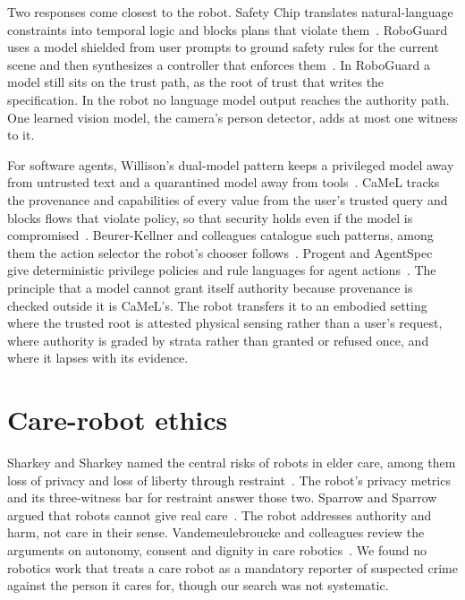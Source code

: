 Two responses come closest to the robot. Safety Chip translates natural-language constraints into
temporal logic and blocks plans that violate them~\cite{yang2024safetychip}. RoboGuard uses a
model shielded from user prompts to ground safety rules for the current scene and then synthesizes
a controller that enforces them~\cite{ravichandran2026roboguard}. In RoboGuard a model still sits
on the trust path, as the root of trust that writes the specification. In the robot no language
model output reaches the authority path. One learned vision model, the camera's person detector,
adds at most one witness to it.

For software agents, Willison's dual-model pattern keeps a privileged model away from untrusted
text and a quarantined model away from tools~\cite{willison2023dualllm}. CaMeL tracks the
provenance and capabilities of every value from the user's trusted query and blocks flows that
violate policy, so that security holds even if the model is compromised~\cite{debenedetti2026camel}.
Beurer-Kellner and colleagues catalogue such patterns, among them the action selector the robot's
chooser follows~\cite{beurerkellner2025patterns}. Progent and AgentSpec give deterministic
privilege policies and rule languages for agent actions~\cite{shi2025progent,wang2026agentspec}.
The principle that a model cannot grant itself authority because provenance is checked outside it
is CaMeL's. The robot transfers it to an embodied setting where the trusted root is attested
physical sensing rather than a user's request, where authority is graded by strata rather than
granted or refused once, and where it lapses with its evidence.

\section{Care-robot ethics}

Sharkey and Sharkey named the central risks of robots in elder care, among them loss of privacy and
loss of liberty through restraint~\cite{sharkey2012granny}. The robot's privacy metrics and its
three-witness bar for restraint answer those two. Sparrow and Sparrow argued that robots cannot
give real care~\cite{sparrow2006hands}. The robot addresses authority and harm, not care in their
sense. Vandemeulebroucke and colleagues review the arguments on autonomy, consent and dignity in
care robotics~\cite{vandemeulebroucke2018care}. We found no robotics work that treats a care robot
as a mandatory reporter of suspected crime against the person it cares for, though our search was
not systematic.

